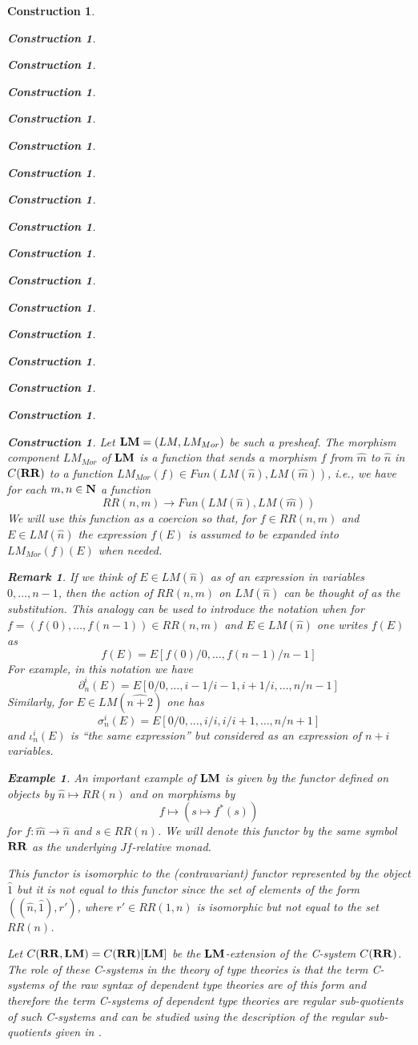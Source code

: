 \documentclass[12pt]{amsart}
\newtheorem{example}[proposition]{Example}
\newtheorem{remark}[proposition]{Remark}
\newtheorem{construction}[proposition]{Construction}
\newcommand{\llabel}[1]{\label{#1}}
\newcommand{\sr}{\rightarrow}
\newcommand{\nn}{{\bf N\rm}}
\newcommand{\nat}{\nn}
\newcommand{\wh}{\widehat}
\newcommand{\mbind}[1]{{#1^*}}
\newcommand{\RR}{{\bf RR}}
\newcommand{\LM}{{\bf LM}}
\begin{document}
\begin{construction}
\begin{construction}
\begin{construction}
\begin{construction}
\begin{construction}
\begin{construction}
\begin{construction}
\begin{construction}
\begin{construction}
\begin{construction}
\begin{construction}
\begin{construction}
\begin{construction}
\begin{construction}
\begin{construction}
\begin{construction}
\begin{construction}
Let $\LM=(LM,LM_{Mor})$ be such a presheaf.
%
%
The morphism component $LM_{Mor}$ of $\LM$ is a function that sends a morphism
$f$ from $\wh{m}$ to $\wh{n}$ in $C(\RR)$ to a function $LM_{Mor}(f)\in
Fun(LM(\wh{n}),LM(\wh{m}))$, i.e., we have for each $m,n\in\nat$ a function
%
$$RR(n,m)\sr Fun(LM(\wh{n}),LM(\wh{m}))$$
%
%
We will use this function as a coercion so that, for $f\in RR(n,m)$ and $E\in
LM(\wh{n})$ the expression $f(E)$ is assumed to be expanded into
$LM_{Mor}(f)(E)$ when needed.
%
\begin{remark}\rm
\llabel{2015.08.18.rem1} 
If we think of $E\in LM(\wh{n})$ as of an expression
in variables $0,\dots,n-1$, then the action of $RR(n,m)$ on $LM(\wh{n})$ can be
thought of as the substitution. This analogy can be used to introduce the
notation when for $f=(f(0),\dots,f(n-1))\in RR(n,m)$ and $E\in LM(\wh{n})$ one
writes $f(E)$ as
%
$$f(E)=E[f(0)/0,\dots,f(n-1)/n-1]$$
%
For example, in this notation we have 
%
$$\partial^i_n(E)=E[0/0,\dots,i-1/i-1,i+1/i,\dots,n/n-1]$$
%
Similarly, for $E\in LM(\wh{n+2})$ one has
%
$$\sigma^i_n(E)=E[0/0,\dots,i/i,i/i+1,\dots,n/n+1]$$
%
and $\iota_n^i(E)$ is ``the same expression'' but considered as an expression of $n+i$ variables.
\end{remark}
%
\begin{example}\rm
\llabel{2015.09.07.rem3} 
An important example of $\LM$ is given by the functor
defined on objects by $\wh{n}\mapsto RR(n)$ and on morphisms by
%
$$f\mapsto (s\mapsto\mbind{f}(s))$$
%
for $f:\wh{m}\sr \wh{n}$ and $s\in RR(n)$. We will denote this functor by the
same symbol $\RR$ as the underlying $Jf$-relative monad.

This functor is isomorphic to the (contravariant) functor represented by the
object $\wh{1}$ but it is not equal to this functor since the set of elements
of the form $((\wh{n},\wh{1}),r')$, where $r'\in RR(1,n)$ is isomorphic but not
equal to the set $RR(n)$.
\end{example}

Let $C(\RR,\LM)=C(\RR)[\LM]$ be the $\LM$-extension of the C-system
$C(\RR)$. The role of these C-systems in the theory of type theories is that
the term C-systems of the raw syntax of dependent type theories are of this
form and therefore the term C-systems of dependent type theories are regular
sub-quotients of such C-systems and can be studied using the description of the
regular sub-quotients given in \cite{Csubsystems}.


\end{construction}
\end{construction}
\end{construction}
\end{construction}
\end{construction}
\end{construction}
\end{construction}
\end{construction}
\end{construction}
\end{construction}
\end{construction}
\end{construction}
\end{construction}
\end{construction}
\end{construction}
\end{construction}
\end{construction}
\end{document}
